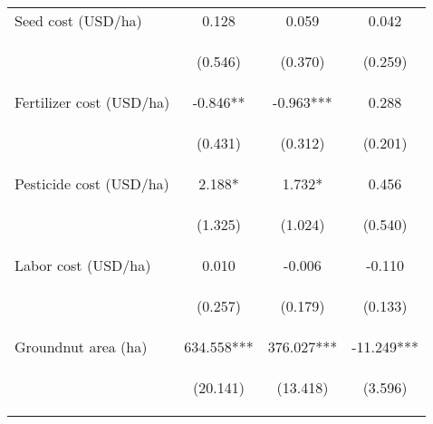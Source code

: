 \begin{center}
\begin{tabular}{lccc}
Seed cost (USD/ha) & 0.128 & 0.059 & 0.042 \\
\vspace{4pt} & \begin{footnotesize}(0.546)\end{footnotesize} & \begin{footnotesize}(0.370)\end{footnotesize} & \begin{footnotesize}(0.259)\end{footnotesize} \\
Fertilizer cost (USD/ha) & -0.846** & -0.963*** & 0.288 \\
\vspace{4pt} & \begin{footnotesize}(0.431)\end{footnotesize} & \begin{footnotesize}(0.312)\end{footnotesize} & \begin{footnotesize}(0.201)\end{footnotesize} \\
Pesticide cost (USD/ha) & 2.188* & 1.732* & 0.456 \\
\vspace{4pt} & \begin{footnotesize}(1.325)\end{footnotesize} & \begin{footnotesize}(1.024)\end{footnotesize} & \begin{footnotesize}(0.540)\end{footnotesize} \\
Labor cost (USD/ha) & 0.010 & -0.006 & -0.110 \\
\vspace{4pt} & \begin{footnotesize}(0.257)\end{footnotesize} & \begin{footnotesize}(0.179)\end{footnotesize} & \begin{footnotesize}(0.133)\end{footnotesize} \\
Groundnut area (ha) & 634.558*** & 376.027*** & -11.249*** \\
\vspace{4pt} & \begin{footnotesize}(20.141)\end{footnotesize} & \begin{footnotesize}(13.418)\end{footnotesize} & \begin{footnotesize}(3.596)\end{footnotesize} \\

\end{tabular}
\end{center}
